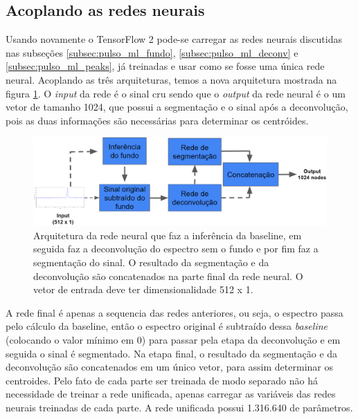 \documentclass[a4paper,12pt,oneside]{book}
\begin{document}
\subsection{Acoplando as redes neurais}

\par Usando novamente o TensorFlow 2 pode-se carregar as redes neurais discutidas nas subseções \ref{subsec:pulso_ml_fundo}, \ref{subsec:pulso_ml_deconv} e \ref{subsec:pulso_ml_peaks}, já treinadas e usar como se fosse uma única rede neural. Acoplando as três arquiteturas, temos a nova arquitetura mostrada na figura \ref{fig:arq:source_to_segmentation}. O \textit{input} da rede é o sinal cru sendo que o \textit{output} da rede neural é o um vetor de tamanho 1024, que possui a segmentação e o sinal após a deconvolução, pois as duas informações são necessárias para determinar os centróides.

\begin{figure}[H]
    \centering
    \includegraphics[scale = 0.35]{figs/arq_source_segmentation.png}
    \caption{Arquitetura da rede neural que faz a inferência da baseline, em seguida faz a deconvolução do espectro sem o fundo e por fim faz a segmentação do sinal. O resultado da segmentação e da deconvolução são concatenados na parte final da rede neural. O vetor de entrada deve ter dimensionalidade 512 x 1.}
    \label{fig:arq:source_to_segmentation}
\end{figure}

\par A rede final é apenas a sequencia das redes anteriores, ou seja, o espectro passa pelo cálculo da baseline, então o espectro original é subtraído dessa \textit{baseline} (colocando o valor mínimo em 0) para passar pela etapa da deconvolução e em seguida o sinal é segmentado. Na etapa final, o resultado da segmentação e da deconvolução são concatenados em um único vetor, para assim determinar os centroides. Pelo fato de cada parte ser treinada de modo separado não há necessidade de treinar a rede unificada, apenas carregar as variáveis das redes neurais treinadas de cada parte. A rede unificada possui 1.316.640 de parâmetros.
\end{document}
